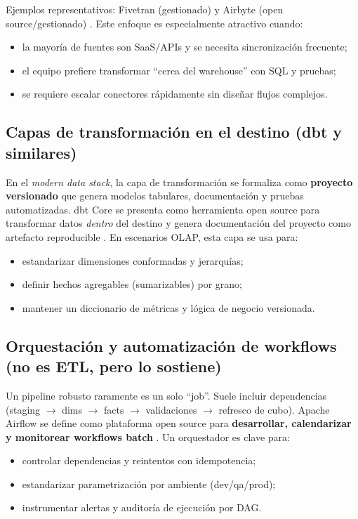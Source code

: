 \documentclass[12pt]{article}
\begin{document}
Ejemplos representativos: Fivetran (gestionado) \cite{fivetran_getting_started} y Airbyte (open source/gestionado) \cite{airbyte_docs,airbyte_github}. Este enfoque es especialmente atractivo cuando:
\begin{itemize}[leftmargin=*]
  \item la mayoría de fuentes son SaaS/APIs y se necesita sincronización frecuente;
  \item el equipo prefiere transformar “cerca del warehouse” con SQL y pruebas;
  \item se requiere escalar conectores rápidamente sin diseñar flujos complejos.
\end{itemize}

\subsection{Capas de transformación en el destino (dbt y similares)}
En el \textit{modern data stack}, la capa de transformación se formaliza como \textbf{proyecto versionado} que genera modelos tabulares, documentación y pruebas automatizadas. dbt Core se presenta como herramienta open source para transformar datos \textit{dentro} del destino \cite{dbt_intro} y genera documentación del proyecto como artefacto reproducible \cite{dbt_docs_build}. En escenarios OLAP, esta capa se usa para:
\begin{itemize}[leftmargin=*]
  \item estandarizar dimensiones conformadas y jerarquías;
  \item definir hechos agregables (sumarizables) por grano;
  \item mantener un diccionario de métricas y lógica de negocio versionada.
\end{itemize}

\subsection{Orquestación y automatización de workflows (no es ETL, pero lo sostiene)}
Un pipeline robusto raramente es un solo “job”. Suele incluir dependencias (staging $\rightarrow$ dims $\rightarrow$ facts $\rightarrow$ validaciones $\rightarrow$ refresco de cubo). Apache Airflow se define como plataforma open source para \textbf{desarrollar, calendarizar y monitorear workflows batch} \cite{airflow_what_is}. Un orquestador es clave para:
\begin{itemize}[leftmargin=*]
  \item controlar dependencias y reintentos con idempotencia;
  \item estandarizar parametrización por ambiente (dev/qa/prod);
  \item instrumentar alertas y auditoría de ejecución por DAG.
\end{itemize}
\end{document}
